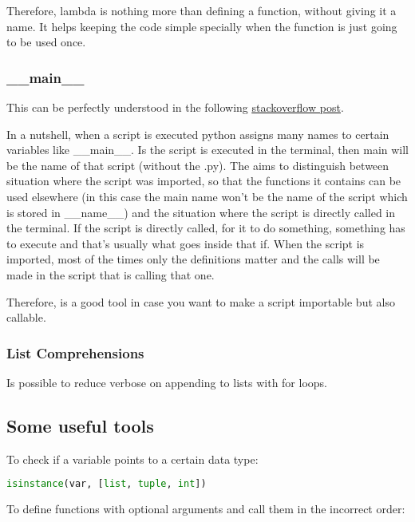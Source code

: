 Therefore, lambda is nothing more than defining a function, without giving it a name. It helps keeping the code simple specially when the function is just going to be used once.




\subsubsection{\_\_main\_\_}
This can be perfectly understood in the following \href{https://stackoverflow.com/questions/419163/what-does-if-name-main-do}{\ul{stackoverflow post}}.

In a nutshell, when a script is executed python assigns many names to certain variables like \_\_main\_\_. Is the script is executed in the terminal, then main will be the name of that script (without the .py). The  aims to distinguish between situation where the script was imported, so that the functions it contains can be used elsewhere (in this case the main name won't be the name of the script which is stored in \_\_name\_\_) and the situation where the script is directly called in the terminal. If the script is directly called, for it to do something, something has to execute and that's usually what goes inside that if. When the script is imported, most of the times only the definitions matter and the calls will be made in the script that is calling that one. 

Therefore, is a good tool in case you want to make a script importable but also callable.

\subsubsection{List Comprehensions}

Is possible to reduce verbose on appending to lists with for loops. 


\subsection{Some useful tools}
To check if a variable points to a certain data type:
\begin{lstlisting}[language=python]
    isinstance(var, [list, tuple, int])
\end{lstlisting}

\vspace{1cm}
To define functions with optional arguments and call them in the incorrect order:

